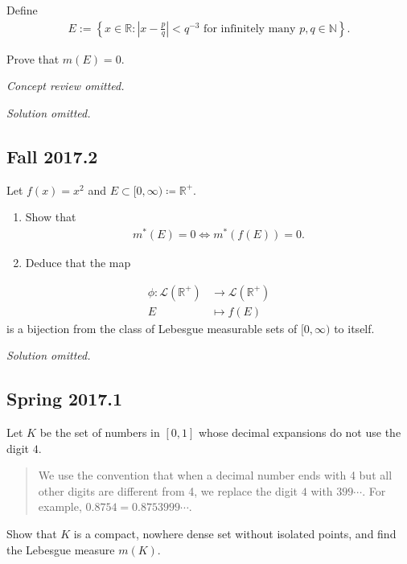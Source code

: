Define
\begin{align*}
E:=\left\{x \in \mathbb{R}:\left|x-\frac{p}{q}\right|<q^{-3} \text { for infinitely many } p, q \in \mathbb{N}\right\}.
\end{align*}

Prove that \(m(E) = 0\).

\emph{Concept review omitted.}

\emph{Solution omitted.}

\hypertarget{fall-2017.2}{%
\subsection{Fall 2017.2}\label{fall-2017.2}}

Let \(f(x) = x^2\) and
\(E \subset [0, \infty) \coloneqq{\mathbb{R}}^+\).

\begin{enumerate}
\def\labelenumi{\arabic{enumi}.}
\item
  Show that
  \begin{align*}
  m^*(E) = 0 \iff m^*(f(E)) = 0.
  \end{align*}
\item
  Deduce that the map
\end{enumerate}

\begin{align*}
\phi: \mathcal{L}({\mathbb{R}}^+) &\to \mathcal{L}({\mathbb{R}}^+) \\
E &\mapsto f(E)
\end{align*}
is a bijection from the class of Lebesgue measurable sets of
\([0, \infty)\) to itself.


\emph{Solution omitted.}

\hypertarget{spring-2017.1}{%
\subsection{Spring 2017.1}\label{spring-2017.1}}

Let \(K\) be the set of numbers in \([0, 1]\) whose decimal expansions
do not use the digit \(4\).

\begin{quote}
We use the convention that when a decimal number ends with 4 but all
other digits are different from 4, we replace the digit \(4\) with
\(399\cdots\). For example, \(0.8754 = 0.8753999\cdots\).
\end{quote}

Show that \(K\) is a compact, nowhere dense set without isolated points,
and find the Lebesgue measure \(m(K)\).

